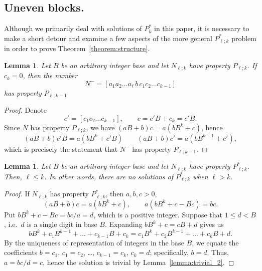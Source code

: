 \documentclass[sn-mathphys]{sn-jnl}%
\theoremstyle{thmstyleone}%
\newtheorem{lemma}[theorem]{Lemma}
\theoremstyle{thmstyletwo}%
\theoremstyle{thmstylethree}%
\begin{document}
\begin{appendices}

\section{Uneven blocks.}

Although we primarily deal with solutions of $P^*_k$ in this paper, it
is necessary to make a short detour and examine a few aspects of the more
general $P^*_{\ell; k}$ problem in order to prove Theorem~\ref{theorem:structure}.

\begin{lemma} \label{lemma:reduce_right}
    Let $B$ be an arbitrary integer base and let $N_{\ell; k}$ have
    property $P_{\ell; k}$. If $c_k = 0$, then the number \[
        N^- = [a_1a_2\dots a_\ell \,b\, c_1c_2\dots c_{k - 1}]
    \] has property $P_{\ell; k - 1}$
\end{lemma}
\begin{proof}
    Denote \[
        c' = [c_1c_2\dots c_{k - 1}], \qquad
        c = c'B + c_k = c'B.
    \] Since $N$ has property $P_{\ell; k}$, we have $(aB + b)c = a(bB^k + c)$, hence \[
        (aB + b)c'B = a(bB^k + c'B) \qquad
        (aB + b)c' = a(bB^{k - 1} + c'),
    \] which is precisely the statement that $N^-$ has property $P_{\ell; k - 1}$.
\end{proof}

\begin{lemma} \label{lemma:block_size}
    Let $B$ be an arbitrary integer base and let $N_{\ell; k}$
    have property $P^*_{\ell; k}$. Then, $\ell \leq k$. 
    In other words, there are no solutions of $P^*_{\ell; k}$ when $\ell > k$.
\end{lemma}
\begin{proof}
    If $N_{\ell; k}$ has property $P^*_{\ell; k}$, then $a, b, c > 0$, \[
        (aB + b)c = a(bB^k + c), \qquad
        a(bB^k + c - Bc) = bc.
    \] Put $bB^k + c - Bc = bc / a = d$, which is a positive integer. Suppose that 
    $1 \leq d < B$, i.e.\ $d$ is a single digit in base $B$. Expanding 
    $bB^k + c = cB + d$ gives us \[
        bB^k + c_1B^{k - 1} + \dots + c_{k - 1}B + c_k = c_1B^k + c_2B^{k - 1} + \dots 
        + c_kB + d.
    \] By the uniqueness of representation of integers in the base $B$, we equate
    the coefficients $b = c_1$, $c_1 = c_2$, \dots, $c_{k - 1} = c_k$, $c_k = d$; 
    specifically, $b = d$. Thus, $a = bc / d = c$, hence the solution is trivial by
    Lemma~\ref{lemma:trivial_2}.


\end{proof}
\end{appendices}
\end{document}
